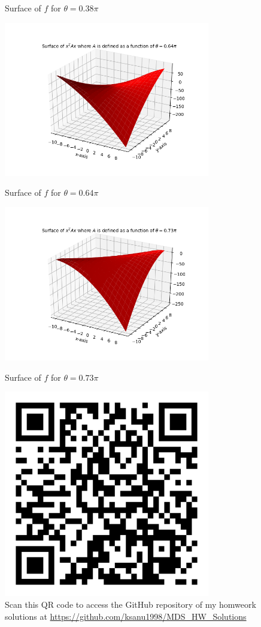 \documentclass{article}
\begin{document}
\begin{flushleft}
\begin{figure}[htp]
        \caption{Surface of $f$ for $\theta=0.38\pi$}
\end{figure}
\begin{figure}[htp]
        \centering
        \includegraphics[width=9cm]{64pi.png}\\
        \caption{Surface of $f$ for $\theta=0.64\pi$}
\end{figure}
\begin{figure}[htp]
        \centering
        \includegraphics[width=9cm]{73pi.png}\\
        \caption{Surface of $f$ for $\theta=0.73\pi$}
\end{figure}
\clearpage
\begin{figure}[htp]
        \centering
        \includegraphics[width=9cm]{qr-code.png}\\
        Scan this QR code to access the GitHub repository of my homweork solutions at \href{https://github.com/ksanu1998/MDS_HW_Solutions}{https://github.com/ksanu1998/MDS\_HW\_Solutions}
\end{figure}
\end{flushleft}
\end{document}
